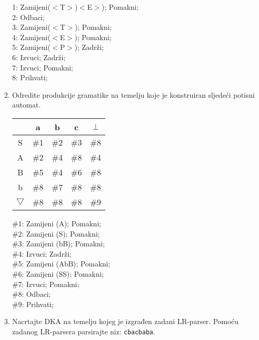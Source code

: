 \documentclass[times, 12pt, utf8]{book}
\begin{document}
\begin{enumerate}[resume]
1: Zamijeni($<$T$>$)$<$E$>$); Pomakni; \\
2: Odbaci; \\
3: Zamijeni($<$T$>$); Pomakni; \\
4: Zamijeni($<$E$>$); Pomakni; \\
5: Zamijeni($<$P$>$); Zadrži; \\
6: Izvuci; Zadrži; \\
7: Izvuci; Pomakni; \\
8: Prihvati; \\

\item
Odredite produkcije gramatike na temelju koje je konstruiran sljedeći potisni automat. \cite[str.~85-99]{udzbenik} \cite{auditorne}

\begin{tabular}{|c|c|c|c|c|} \hline
 & a & b & c & $\perp$ \\ \hline
S & \#1 & \#2 & \#3 & \#8 \\ \hline
A & \#2 & \#4 & \#8 & \#4 \\ \hline
B & \#5 & \#4 & \#6 & \#8 \\ \hline
b & \#8 & \#7 & \#8 & \#8 \\ \hline
$\bigtriangledown$ & \#8 & \#8 & \#8 & \#9 \\ \hline
\end{tabular}

\#1: Zamijeni (A); Pomakni; \\
\#2: Zamijeni (S); Pomakni; \\
\#3: Zamijeni (bB); Pomakni; \\
\#4: Izvuci; Zadrži; \\
\#5: Zamijeni (AbB); Pomakni; \\
\#6: Zamijeni (SS); Pomakni; \\
\#7: Izvuci; Pomakni; \\
\#8: Odbaci; \\
\#9: Prihvati; \\

\item
Nacrtajte DKA na temelju kojeg je izgrađen zadani LR-parser.
Pomoću zadanog LR-parsera parsirajte niz: \texttt{cbacbaba}. \cite[str.~140-144]{udzbenik}


\end{enumerate}
\end{document}
